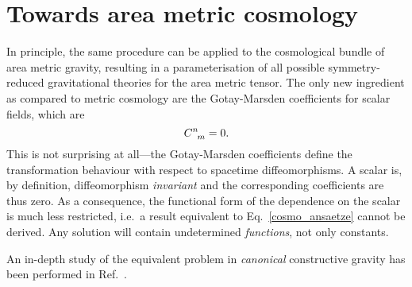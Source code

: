 \section{Towards area metric cosmology}

In principle, the same procedure can be applied to the cosmological bundle of area metric gravity, resulting in a parameterisation of all possible symmetry-reduced gravitational theories for the area metric tensor. The only new ingredient as compared to metric cosmology are the Gotay-Marsden coefficients for scalar fields, which are
\begin{equation}
  \gmc{}{}{n}{m} = 0.
\end{equation}
This is not surprising at all---the Gotay-Marsden coefficients define the transformation behaviour with respect to spacetime diffeomorphisms. A scalar is, by definition, diffeomorphism \emph{invariant} and the corresponding coefficients are thus zero. As a consequence, the functional form of the dependence on the scalar is much less restricted, i.e.\ a result equivalent to Eq.~\eqref{cosmo_ansaetze} cannot be derived. Any solution will contain undetermined \emph{functions}, not only constants.

An in-depth study of the equivalent problem in \emph{canonical} constructive gravity has been performed in Ref.\ \cite{Duell_2020}.

